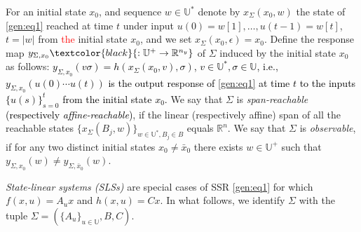 \documentclass[journal,twoside,web]{ieeecolor}
\begin{document}
For an initial state $x_0$,  and sequence $w \in \mathbb{U}^{*}$
denote by $x_{\Sigma}(x_0,w)$ the state of \eqref{gen:eq1} 
reached at time $t$ under input $u(0)=w[1],\ldots, u(t-1)=w[t]$, $t=|w|$ from \textcolor{red}{the} initial state $x_0$, and we set 
$x_{\Sigma}(x_0,\epsilon)=x_0$.
Define the response map $y_{\Sigma,x_0}\textcolor{black}{:\mathbb{U}^{+} \rightarrow \mathbb{R}^{n_y}}$ of $\Sigma$ induced by the
initial state $x_0$ as follows: \textcolor{black}{$y_{\Sigma,x_0}(v\sigma)=h(x_{\Sigma}(x_0,v),\sigma)$,
$v \in \mathbb{U}^{*},\sigma \in \mathbb{U}$, i.e.,
  $y_{\Sigma,x_0}(u(0)\cdots u(t))$ is the output response of
  \eqref{gen:eq1} at time $t$ to the inputs $\{u(s)\}_{s=0}^{t}$ from the initial state $x_0$.
}
We say that $\Sigma$ is \emph{span-reachable} \textcolor{black}{(respectively \emph{affine-reachable})}, 
if the linear (respectively affine) span of all the reachable states $\{x_{\Sigma}(B_j,w)\}_{w \in \mathbb{U}^{*}, B_j \in B}$
equals $\mathbb{R}^n$. We say that $\Sigma$ is \emph{observable}, if 
for any two distinct initial states $x_0 \ne \bar{x}_0$ there exists $w \in \mathbb{U}^{+}$ such that
$y_{\Sigma,x_0}(w) \ne y_{\Sigma,\bar{x}_0}(w)$. 



\emph{State-linear systems (SLSs)} are special cases of SSR \eqref{gen:eq1} 
for which $f(x,u)=A_u x$ and $h(x,u)=Cx$. In what follows, we identify $\Sigma$ with the tuple 
$\Sigma=(\{A_u\}_{u \in \mathbb{U}},B,C)$. 
   
\end{document}
